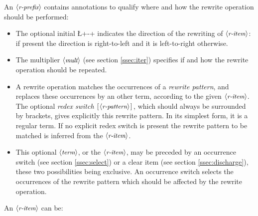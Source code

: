 

An $\langle\mbox{\itshape\rmfamily\small r-prefix}\rangle$ contains annotations to qualify where and how   the
rewrite operation should be performed:
\begin{itemize}
\item The optional initial \L+-+ indicates the direction of the rewriting
  of $\langle\mbox{\itshape\rmfamily\small r-item}\rangle$: if present the direction is right-to-left and it is
  left-to-right otherwise.
\item The multiplier $\langle\mbox{\itshape\rmfamily\small mult}\rangle$ (see section \ref{ssec:iter})
  specifies if and how the rewrite operation should be repeated.
\item A rewrite operation matches the occurrences of a \emph{rewrite
  pattern}, and replaces these occurrences by an other term, according
  to the given $\langle\mbox{\itshape\rmfamily\small r-item}\rangle$.
  The optional \emph{redex switch} $\C{[}\N{r-pattern}\C{]}$, which
  should always be surrounded by brackets, gives explicitly this
  rewrite pattern. In its simplest form, it is a regular term.
  If no explicit redex switch
  is present the rewrite pattern to be matched is inferred from the
  $\langle\mbox{\itshape\rmfamily\small r-item}\rangle$.
\item This optional $\langle\mbox{\itshape\rmfamily\small term}\rangle$, or
  the $\langle\mbox{\itshape\rmfamily\small r-item}\rangle$, may be preceded by an
  occurrence switch (see section \ref{ssec:select}) or a clear item
  (see section \ref{ssec:discharge}), these two possibilities being
  exclusive. An occurrence switch selects the occurrences of the
  rewrite pattern which should be affected by the rewrite operation.
\end{itemize}


An $\langle\mbox{\itshape\rmfamily\small r-item}\rangle$ can be:


